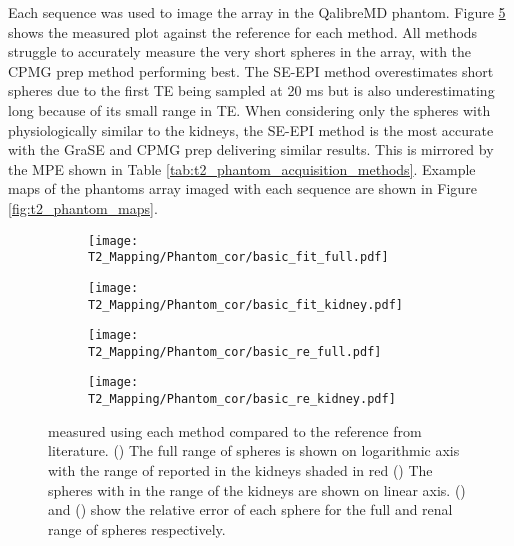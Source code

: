 Each sequence was used to image the \ttwo array in the QalibreMD phantom. Figure \ref{fig:t2_phantom_cor} shows the measured \ttwo plot against the reference \ttwo for each method. All methods struggle to accurately measure the very short \ttwo spheres in the array, with the \ac{CPMG} \ttwo prep method performing best. The \ac{SE}-\ac{EPI} method overestimates short \ttwo spheres due to the first \ac{TE} being sampled at 20 ms but is also underestimating long \ttwo because of its small range in \ac{TE}. When considering only the spheres with physiologically similar \ttwo to the kidneys, the \ac{SE}-\ac{EPI} method is the most accurate with the \ac{GraSE} and \ac{CPMG} \ttwo prep delivering similar results. This is mirrored by the \ac{MPE} shown in Table \ref{tab:t2_phantom_acquisition_methods}. Example \ttwo maps of the phantoms \ttwo array imaged with each sequence are shown in Figure \ref{fig:t2_phantom_maps}.

\begin{figure}[H]
	\centering
	\begin{subfigure}[c]{0.47\textwidth}
		\centering
		\texttt{[image: T2\_Mapping/Phantom\_cor/basic\_fit\_full.pdf]}
		\caption{}
		\label{fig:t2_phantom_cor_full}
	\end{subfigure}
	\hfill
	\begin{subfigure}[c]{0.47\textwidth}
		\centering
		\texttt{[image: T2\_Mapping/Phantom\_cor/basic\_fit\_kidney.pdf]}
		\caption{}
		\label{fig:t2_phantom_cor_kidney}
	\end{subfigure}
	\vfill
		\begin{subfigure}[c]{0.47\textwidth}
		\centering
		\texttt{[image: T2\_Mapping/Phantom\_cor/basic\_re\_full.pdf]}
		\caption{}
		\label{fig:t2_phantom_re_full}
	\end{subfigure}
	\hfill
	\begin{subfigure}[c]{0.47\textwidth}
		\centering
		\texttt{[image: T2\_Mapping/Phantom\_cor/basic\_re\_kidney.pdf]}
		\caption{}
		\label{fig:t2_phantom_re_kidney}
	\end{subfigure}
	\caption{\ttwo measured using each method compared to the reference \ttwo from literature. () The full range of \ttwo spheres is shown on logarithmic axis with the range of \ttwo reported in the kidneys shaded in red () The spheres with \ttwo in the range of the kidneys are shown on linear axis. () and () show the relative error of each sphere for the full and renal range of spheres respectively.}
	\label{fig:t2_phantom_cor}
\end{figure}

